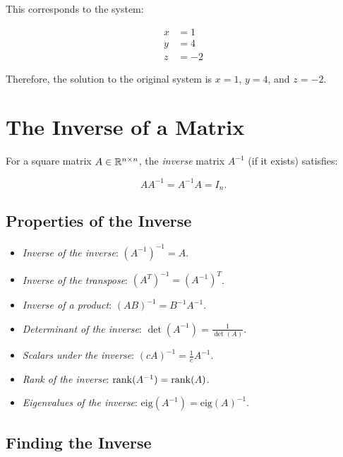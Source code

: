 This corresponds to the system:

\begin{align*}
    x & = 1  \\
    y & = 4  \\
    z & = -2
\end{align*}

Therefore, the solution to the original system is \(x = 1\), \(y = 4\), and \(z = -2\).


\section{The Inverse of a Matrix}

For a square matrix \(A \in \mathbb{R}^{n \times n}\), the \emph{inverse} matrix \(A^{-1}\) (if it exists) satisfies:

\[
    A A^{-1} = A^{-1} A = I_n.
\]

\subsection{Properties of the Inverse}


\begin{itemize}

    \item \emph{Inverse of the inverse}: \({(A^{-1})}^{-1} = A\). 

    \item \emph{Inverse of the transpose}: \({(A^T)}^{-1} = {(A^{-1})}^T\).

    \item \emph{Inverse of a product}: \({(AB)}^{-1} = B^{-1}A^{-1}\).

    \item \emph{Determinant of the inverse}: \(\det(A^{-1}) = \frac{1}{\det(A)}\).

    \item \emph{Scalars under the inverse}: \((cA)^{-1} = \frac{1}{c} A^{-1}\).

    \item \emph{Rank of the inverse}: \(\mathrm{rank}(A^{-1}) = \mathrm{rank}(A) \). 

    \item \emph{Eigenvalues of the inverse}: \(\mathrm{eig}(A^{-1}) = \mathrm{eig}(A)^{-1}\).
\end{itemize}

\subsection{Finding the Inverse}

